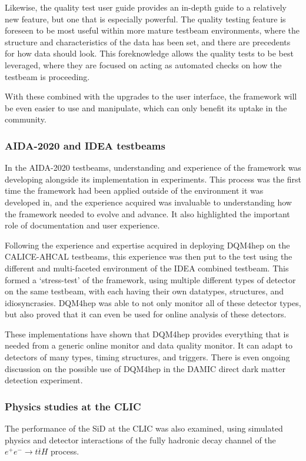 Likewise, the quality test user guide provides an in-depth guide to a relatively new feature, but one that is especially powerful. The quality testing feature is foreseen to be most useful within more mature testbeam environments, where the structure and characteristics of the data has been set, and there are precedents for how data should look. This foreknowledge allows the quality tests to be best leveraged, where they are focused on acting as automated checks on how the testbeam is proceeding.

With these combined with the upgrades to the user interface, the framework will be even easier to use and manipulate, which can only benefit its uptake in the community.

\subsubsection*{AIDA-2020 and IDEA testbeams}
In the AIDA-2020 testbeams, understanding and experience of the framework was developing alongside its implementation in experiments. This process was the first time the framework had been applied outside of the environment it was developed in, and the experience acquired was invaluable to understanding how the framework needed to evolve and advance. It also highlighted the important role of documentation and user experience.

Following the experience and expertise acquired in deploying \acrshort{DQM4hep} on the \acrshort{CALICE}-\acrshort{AHCAL} testbeams, this experience was then put to the test using the different and multi-faceted environment of the \acrshort{IDEA} combined testbeam. This formed a `stress-test' of the framework, using multiple different types of detector on the same testbeam, with each having their own datatypes, structures, and idiosyncrasies. \acrshort{DQM4hep} was able to not only monitor all of these detector types, but also proved that it can even be used for online analysis of these detectors.

These implementations have shown that \acrshort{DQM4hep} provides everything that is needed from a generic online monitor and data quality monitor. It can adapt to detectors of many types, timing structures, and triggers. There is even ongoing discussion on the possible use of \acrshort{DQM4hep} in the \acrshort{DAMIC} direct dark matter detection experiment. 

\subsubsection*{Physics studies at the \acrlong{CLIC}}
The performance of the \acrshort{SiD} at the \acrlong{CLIC} was also examined, using simulated physics and detector interactions of the fully hadronic decay channel of the $e^+ e^- \rightarrow t \overline{t} H$ process. 

